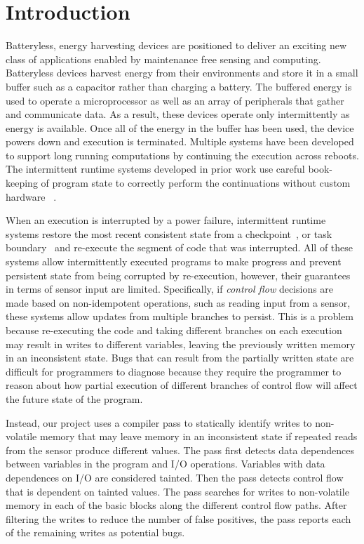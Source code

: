 \section{Introduction}

Batteryless, energy harvesting devices are positioned to deliver an exciting new
class of applications enabled by maintenance free sensing and computing.
Batteryless devices harvest energy from their environments and store it in a
small buffer such as a capacitor rather than charging a battery.  The buffered
energy is used to operate a microprocessor as well as an array of peripherals
that gather and communicate data. As a result, these devices operate only
intermittently as energy is available.
%
Once all of the energy in the buffer has been used, the device powers down and
execution is terminated. Multiple systems have been developed to support long
running computations by continuing the execution across reboots. The
intermittent runtime systems developed in prior work use careful book-keeping of
program state to correctly perform the continuations  without custom hardware
~\cite{chain,dino,mementos,alpaca,mayfly,ratchet}.

When an execution is interrupted by a power failure, intermittent runtime
systems restore the most recent consistent state from a
checkpoint~\cite{mementos,ratchet}, or task boundary~\cite{chain,alpaca,dino} and
re-execute the segment of code that was interrupted.
%
All of these systems allow intermittently executed programs to make progress and
prevent persistent state from being corrupted by re-execution, however, their
guarantees in terms of sensor input are limited. Specifically, if \emph{control
flow} decisions are made based on non-idempotent operations, such as reading
input from a sensor, these systems allow updates from multiple branches to
persist.
%
This is a problem because re-executing the code and taking different branches on
each execution may result in writes to different variables, leaving the
previously written memory in an inconsistent state.
%
Bugs that can result from the partially written state are difficult for
programmers to diagnose because they require the programmer to reason about how
partial execution of different branches of control flow will affect the future
state of the program.
%

Instead, our project uses a compiler pass to statically identify writes to
non-volatile memory that may leave memory in an inconsistent state if repeated
reads from the sensor produce different values. The pass first detects data
dependences between variables in the program and I/O operations. Variables with
data dependences on I/O are considered tainted. Then the pass detects control
flow that is dependent on tainted values. The pass searches for writes to
non-volatile memory in each of the basic blocks along the different control flow
paths. After filtering the writes to reduce the number of false positives, the
pass reports each of the remaining writes as potential bugs.

